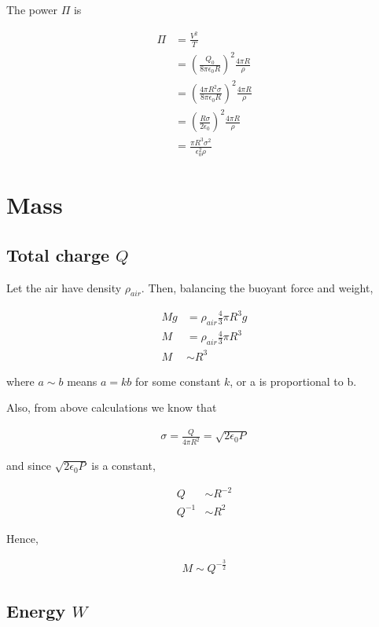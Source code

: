 \documentclass{article}
\begin{document}
The power $\Pi$ is

\begin{align*}
\Pi &= \frac{V^2}{T} \\
&= (\frac{Q_0}{8\pi\epsilon_0R})^2 \frac{4\pi R}{\rho} \\
&= (\frac{4\pi R^2 \sigma}{8\pi\epsilon_0R})^2  \frac{4\pi R}{\rho} \\
&= (\frac{ R \sigma}{2\epsilon_0})^2  \frac{4\pi R}{\rho} \\
&= \frac{\pi R^3 \sigma^2}{\epsilon_0^2 \rho}
\end{align*}

\section{Mass}

\subsection{Total charge $Q$}

Let the air have density $\rho_{air}$. Then, balancing the buoyant force and weight,

\begin{align*}
Mg &= \rho_{air} \frac{4}{3}\pi R^3 g \\
M &= \rho_{air} \frac{4}{3}\pi R^3 \\
M &\sim R^3
\end{align*}

where $a \sim b$ means $a = kb$ for some constant $k$, or a is proportional to b.

Also, from above calculations we know that

\begin{align*}
\sigma = \frac{Q}{4\pi R^2} = \sqrt{2\epsilon_0 P}
\end{align*}

and since $\sqrt{2\epsilon_0 P}$ is a constant,

\begin{align*}
Q &\sim R^{-2} \\
Q^{-1} &\sim R^2
\end{align*}

Hence,

\begin{align*}
M \sim Q^{-\frac{3}{2}}
\end{align*}

\subsection{Energy $W$}
\end{document}
